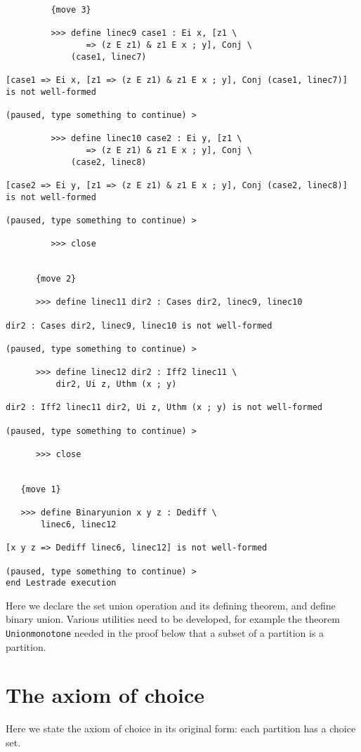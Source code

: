 \documentclass[12pt]{article}
\begin{document}
\begin{verbatim}
         {move 3}

         >>> define linec9 case1 : Ei x, [z1 \
                => (z E z1) & z1 E x ; y], Conj \
             (case1, linec7)

[case1 => Ei x, [z1 => (z E z1) & z1 E x ; y], Conj (case1, linec7)] is not well-formed

(paused, type something to continue) >

         >>> define linec10 case2 : Ei y, [z1 \
                => (z E z1) & z1 E x ; y], Conj \
             (case2, linec8)

[case2 => Ei y, [z1 => (z E z1) & z1 E x ; y], Conj (case2, linec8)] is not well-formed

(paused, type something to continue) >

         >>> close


      {move 2}

      >>> define linec11 dir2 : Cases dir2, linec9, linec10

dir2 : Cases dir2, linec9, linec10 is not well-formed

(paused, type something to continue) >

      >>> define linec12 dir2 : Iff2 linec11 \
          dir2, Ui z, Uthm (x ; y)

dir2 : Iff2 linec11 dir2, Ui z, Uthm (x ; y) is not well-formed

(paused, type something to continue) >

      >>> close


   {move 1}

   >>> define Binaryunion x y z : Dediff \
       linec6, linec12

[x y z => Dediff linec6, linec12] is not well-formed

(paused, type something to continue) >
end Lestrade execution
\end{verbatim}


Here we declare the set union operation and its defining theorem, and define binary union.  Various utilities need to be developed, for example the theorem
{\tt Unionmonotone} needed in the proof below that a subset of a partition is a partition.

\section{The axiom of choice}

Here we state the axiom of choice in its original form:  each partition has a choice set.
\end{document}
